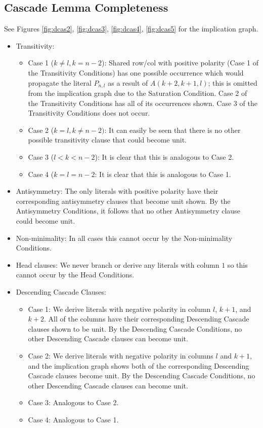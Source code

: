 \documentclass[a4paper,UKenglish,cleveref, autoref, thm-restate]{lipics-v2021}
\begin{document}
\subsection{Cascade Lemma Completeness}
See Figures \ref{fig:dcas2}, \ref{fig:dcas3}, \ref{fig:dcas4}, \ref{fig:dcas5} for the implication graph.
\begin{itemize}
    \item Transitivity: 
    \begin{itemize}
        \item Case 1 ($k \neq l, k = n - 2$): Shared row/col with positive polarity (Case 1 of the Transitivity Conditions) has one possible occurrence which would propagate the literal $P_{n, l}$ as a result of $A(k + 2, k + 1, l)$; this is omitted from the implication graph due to the Saturation Condition. Case 2 of the Transitivity Conditions has all of its occurrences shown. Case 3 of the Transitivity Conditions does not occur.
        \item Case 2 ($k = l, k \neq n - 2)$: It can easily be seen that there is no other possible transitivity clause that could become unit.
        \item Case 3 ($l < k < n - 2$): It is clear that this is analogous to Case 2.
        \item Case 4 ($k = l = n - 2$: It is clear that this is analogous to Case 1.
    \end{itemize}
    \item Antisymmetry: The only literals with positive polarity have their corresponding antisymmetry clauses that become unit shown. By the Antisymmetry Conditions, it follows that no other Antisymmetry clause could become unit. 
    \item Non-minimality: In all cases this cannot occur by the Non-minimality Conditions. 
    \item Head clauses: We never branch or derive any literals with column $1$ so this cannot occur by the Head Conditions.
    \item Descending Cascade Clauses: 
    \begin{itemize}
        \item Case 1: We derive literals with negative polarity in column $l$, $k + 1$, and $k + 2$. All of the columns have their corresponding Descending Cascade clauses shown to be unit. By the Descending Cascade Conditions, no other Descending Cascade clauses can become unit. 
        \item Case 2: We derive literals with negative polarity in columns $l$ and $k + 1$, and the implication graph shows both of the corresponding Descending Cascade clauses become unit. By the Descending Cascade Conditions, no other Descending Cascade clauses can become unit. 
        \item Case 3: Analogous to Case 2. 
        \item Case 4: Analogous to Case 1.
    \end{itemize}
\end{itemize}
\end{document}
